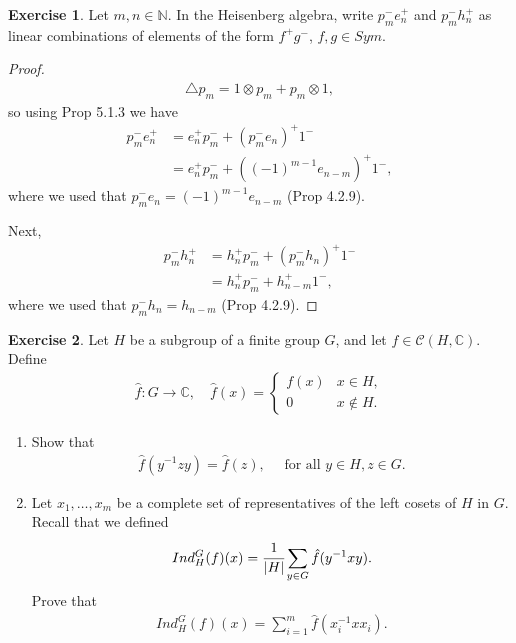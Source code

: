 \documentclass[8pt]{extarticle}
\newcommand{\abs}[1]{|#1|}
\newcommand{\N}{\mathbb{N}}
\newcommand{\C}{\mathbb{C}}
\newcommand{\<}{\langle}
\renewcommand{\>}{\rangle}
\theoremstyle{definition}
\newtheorem{exercise}{Exercise}
\begin{document}
\newpage
\begin{exercise}
  Let $m,n \in \N$. In the Heisenberg algebra, write $p_m^-e_n^+$ and $p_m^-h_n^+$ as linear combinations of elements of the form $f^+g^-$, $f,g \in Sym$.
\end{exercise}
\begin{proof}
  \begin{align*}
    \triangle p_m = 1 \otimes p_m + p_m \otimes 1,
  \end{align*}
  so using Prop 5.1.3 we have 
  \begin{align*}
    p_m^- e_n^+
    &=
    e_n^+p_m^- + (p_m^-e_n)^+1^- \\
    &=
    e_n^+p_m^- + ((-1)^{m-1}e_{n-m})^+1^-,
  \end{align*}
  where we used that $p_m^- e_n = (-1)^{m-1}e_{n-m}$ (Prop 4.2.9).

  Next,
  \begin{align*}
    p_m^-h_n^+
    &=
    h_n^+p_m^- + (p_m^-h_n)^+1^- \\
    &= h_n^+p_m^- + h_{n-m}^+1^-,
  \end{align*}
  where we used that $p_m^-h_n = h_{n-m}$ (Prop 4.2.9).
\end{proof}
\begin{exercise}
  Let $H$ be a subgroup of a finite group $G$, and let $f \in \mathcal{C}(H,\C)$. Define
  \begin{align*}
    \hat f : G \to \C, \quad \hat f (x) = 
    \begin{cases}
      f(x) & x \in H, \\
      0 & x \not \in H. 
    \end{cases}
  \end{align*}
  \begin{enumerate}
  \item
    Show that
    \begin{align*}
      \hat f (y^{-1} z y) = \hat f (z), \quad \text{ for all } y \in H, z \in G. 
    \end{align*}
  \item
    Let $x_1, \dots, x_m$ be a complete set of representatives of the left cosets of $H$ in $G$. Recall that we defined
    \begin{align*}
      Ind_H^G(f)(x) = \cfrac{1}{\abs{H}} \sum\limits_{y \in G} \hat f (y^{-1}xy).
    \end{align*}
    Prove that
    \begin{align*}
      Ind_H^G(f)(x) = \sum\limits_{i=1}^m \hat f (x_i^{-1}xx_i).      
    \end{align*}
  \end{enumerate}
\end{exercise}
\end{document}
